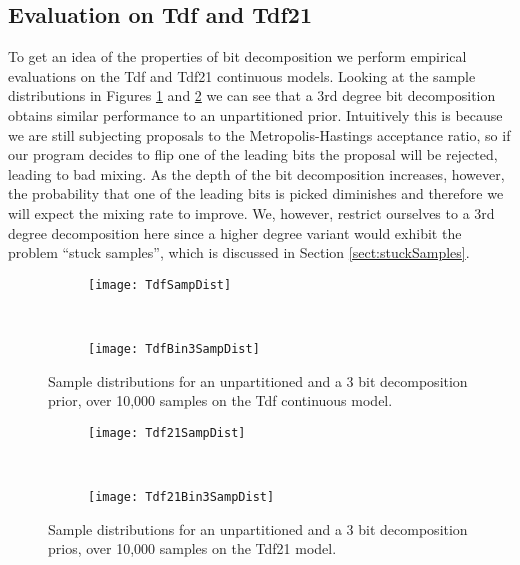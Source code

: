 \subsection{Evaluation on Tdf and Tdf21}

To get an idea of the properties of bit decomposition we perform empirical evaluations on the Tdf and Tdf21 continuous models. Looking at the sample distributions in Figures \ref{fig:tdfPSampDist} and \ref{fig:tdf21PSampDist} we can see that a 3rd degree bit decomposition obtains similar performance to an unpartitioned prior. Intuitively this is because we are still subjecting proposals to the Metropolis-Hastings acceptance ratio, so if our program decides to flip one of the leading bits the proposal will be rejected, leading to bad mixing. As the depth of the bit decomposition increases, however, the probability that one of the leading bits is picked diminishes and therefore we will expect the mixing rate to improve.  We, however, restrict ourselves to a 3rd degree decomposition here since a higher degree variant would exhibit the problem ``stuck samples'', which is discussed in Section \ref{sect:stuckSamples}.

\begin{figure}[h]
    \centering
    \begin{subfigure}[t]{0.48\textwidth}
      \texttt{[image: TdfSampDist]}
    \end{subfigure}
    ~
    \begin{subfigure}[t]{0.48\textwidth}
      \texttt{[image: TdfBin3SampDist]}
    \end{subfigure}
    \caption{Sample distributions for an unpartitioned and a 3 bit decomposition prior, over 10,000 samples on the Tdf continuous model.}
    \label{fig:tdfPSampDist}
\end{figure}

\begin{figure}[h]
    \centering
    \begin{subfigure}[t]{0.48\textwidth}
      \texttt{[image: Tdf21SampDist]}
    \end{subfigure}
    ~
    \begin{subfigure}[t]{0.48\textwidth}
      \texttt{[image: Tdf21Bin3SampDist]}
    \end{subfigure}
    \caption{Sample distributions for an unpartitioned and a 3 bit decomposition prios, over 10,000 samples on the Tdf21 model.}
    \label{fig:tdf21PSampDist}
\end{figure}


